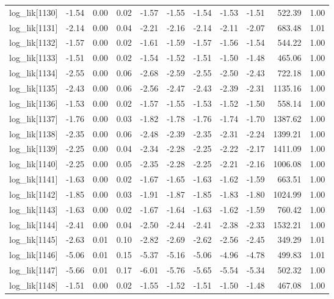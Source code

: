 \begin{table}[ht]
\begin{tabular}{rrrrrrrrrrr}
  log\_lik[1130] & -1.54 & 0.00 & 0.02 & -1.57 & -1.55 & -1.54 & -1.53 & -1.51 & 522.39 & 1.00 \\ 
  log\_lik[1131] & -2.14 & 0.00 & 0.04 & -2.21 & -2.16 & -2.14 & -2.11 & -2.07 & 683.48 & 1.01 \\ 
  log\_lik[1132] & -1.57 & 0.00 & 0.02 & -1.61 & -1.59 & -1.57 & -1.56 & -1.54 & 544.22 & 1.00 \\ 
  log\_lik[1133] & -1.51 & 0.00 & 0.02 & -1.54 & -1.52 & -1.51 & -1.50 & -1.48 & 465.06 & 1.00 \\ 
  log\_lik[1134] & -2.55 & 0.00 & 0.06 & -2.68 & -2.59 & -2.55 & -2.50 & -2.43 & 722.18 & 1.00 \\ 
  log\_lik[1135] & -2.43 & 0.00 & 0.06 & -2.56 & -2.47 & -2.43 & -2.39 & -2.31 & 1135.16 & 1.00 \\ 
  log\_lik[1136] & -1.53 & 0.00 & 0.02 & -1.57 & -1.55 & -1.53 & -1.52 & -1.50 & 558.14 & 1.00 \\ 
  log\_lik[1137] & -1.76 & 0.00 & 0.03 & -1.82 & -1.78 & -1.76 & -1.74 & -1.70 & 1387.62 & 1.00 \\ 
  log\_lik[1138] & -2.35 & 0.00 & 0.06 & -2.48 & -2.39 & -2.35 & -2.31 & -2.24 & 1399.21 & 1.00 \\ 
  log\_lik[1139] & -2.25 & 0.00 & 0.04 & -2.34 & -2.28 & -2.25 & -2.22 & -2.17 & 1411.09 & 1.00 \\ 
  log\_lik[1140] & -2.25 & 0.00 & 0.05 & -2.35 & -2.28 & -2.25 & -2.21 & -2.16 & 1006.08 & 1.00 \\ 
  log\_lik[1141] & -1.63 & 0.00 & 0.02 & -1.67 & -1.65 & -1.63 & -1.62 & -1.59 & 663.51 & 1.00 \\ 
  log\_lik[1142] & -1.85 & 0.00 & 0.03 & -1.91 & -1.87 & -1.85 & -1.83 & -1.80 & 1024.99 & 1.00 \\ 
  log\_lik[1143] & -1.63 & 0.00 & 0.02 & -1.67 & -1.64 & -1.63 & -1.62 & -1.59 & 760.42 & 1.00 \\ 
  log\_lik[1144] & -2.41 & 0.00 & 0.04 & -2.50 & -2.44 & -2.41 & -2.38 & -2.33 & 1532.21 & 1.00 \\ 
  log\_lik[1145] & -2.63 & 0.01 & 0.10 & -2.82 & -2.69 & -2.62 & -2.56 & -2.45 & 349.29 & 1.01 \\ 
  log\_lik[1146] & -5.06 & 0.01 & 0.15 & -5.37 & -5.16 & -5.06 & -4.96 & -4.78 & 499.83 & 1.01 \\ 
  log\_lik[1147] & -5.66 & 0.01 & 0.17 & -6.01 & -5.76 & -5.65 & -5.54 & -5.34 & 502.32 & 1.00 \\ 
  log\_lik[1148] & -1.51 & 0.00 & 0.02 & -1.55 & -1.52 & -1.51 & -1.50 & -1.48 & 467.08 & 1.00 \\ 

\end{tabular}
\end{table}
